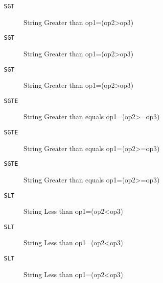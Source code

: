 
\begin{description}
\item[\texttt{SGT        }]  String Greater than op1=(op2>op3)\\
\end{description}

\begin{description}
\item[\texttt{SGT        }]  String Greater than op1=(op2>op3)\\
\end{description}

\begin{description}
\item[\texttt{SGT        }]  String Greater than op1=(op2>op3)\\
\end{description}

\begin{description}
\item[\texttt{SGTE       }]  String Greater than equals op1=(op2>=op3)\\
\end{description}

\begin{description}
\item[\texttt{SGTE       }]  String Greater than equals op1=(op2>=op3)\\
\end{description}

\begin{description}
\item[\texttt{SGTE       }]  String Greater than equals op1=(op2>=op3)\\
\end{description}

\begin{description}
\item[\texttt{SLT        }]  String Less than op1=(op2<op3)\\
\end{description}

\begin{description}
\item[\texttt{SLT        }]  String Less than op1=(op2<op3)\\
\end{description}

\begin{description}
\item[\texttt{SLT        }]  String Less than op1=(op2<op3)\\
\end{description}
